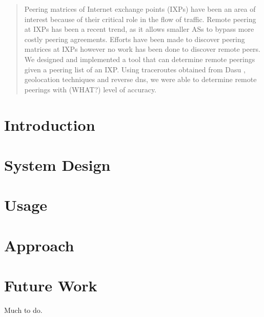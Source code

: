\documentclass{acm_proc_article-sp}
\begin{document}
\maketitle
\begin{abstract}
Peering matrices of Internet exchange points (IXPs) have been an area of interest because of their
critical role in the flow of traffic. \cite{Augustin:2009}
Remote peering at IXPs has been a recent trend, as it allows smaller ASs to bypass more costly 
peering agreements.
Efforts have been made to discover peering matrices at IXPs however no work has been done 
to discover remote peers. We designed and implemented a tool that can determine remote peerings
given a peering list of an IXP. Using traceroutes obtained from Dasu \cite{Sanchez:2011}, geolocation
techniques and reverse dns, we were able to determine remote peerings with 
(WHAT?) level of accuracy.
\end{abstract}




\section{Introduction}

\section{System Design}


\section{Usage}

\section{Approach}
\label{sec:approach}

\section{Future Work}
\label{sec:future}
Much to do.



\end{document}

